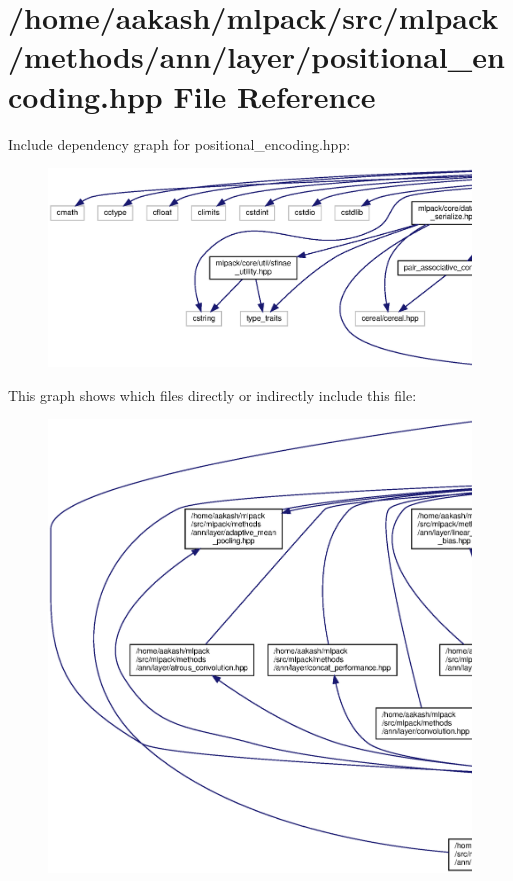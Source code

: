 \section{/home/aakash/mlpack/src/mlpack/methods/ann/layer/positional\+\_\+encoding.hpp File Reference}
\label{positional__encoding_8hpp}
Include dependency graph for positional\+\_\+encoding.\+hpp\+:
\nopagebreak
\begin{figure}[H]
\begin{center}
\leavevmode
\includegraphics[width=350pt]{positional__encoding_8hpp__incl}
\end{center}
\end{figure}
This graph shows which files directly or indirectly include this file\+:
\nopagebreak
\begin{figure}[H]
\begin{center}
\leavevmode
\includegraphics[width=350pt]{positional__encoding_8hpp__dep__incl}
\end{center}
\end{figure}
